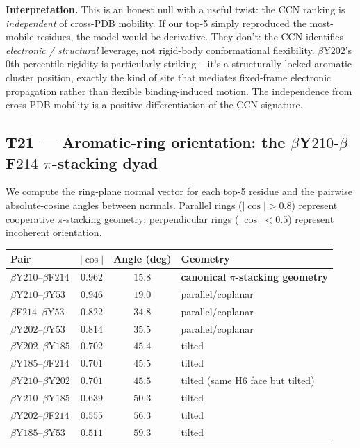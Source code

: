 \documentclass[11pt,a4paper]{article}
\begin{document}
\textbf{Interpretation.} This is an honest null with a useful twist:
the CCN ranking is \emph{independent} of cross-PDB mobility. If our
top-5 simply reproduced the most-mobile residues, the model would be
derivative. They don't: the CCN identifies \emph{electronic / structural}
leverage, not rigid-body conformational flexibility. $\beta$Y$202$'s
0th-percentile rigidity is particularly striking -- it's a structurally
locked aromatic-cluster position, exactly the kind of site that
mediates fixed-frame electronic propagation rather than flexible
binding-induced motion. The independence from cross-PDB mobility is
a positive differentiation of the CCN signature.

\subsection{\textsf{T21} --- Aromatic-ring orientation: the $\beta$Y$210$-$\beta$F$214$ $\pi$-stacking dyad}\label{ssec:t21}

We compute the ring-plane normal vector for each top-5 residue and
the pairwise absolute-cosine angles between normals. Parallel
rings ($|\cos| > 0.8$) represent cooperative $\pi$-stacking geometry;
perpendicular rings ($|\cos| < 0.5$) represent incoherent orientation.

\begin{center}\small
\begin{tabular}{lccl}\toprule
Pair & $|\cos|$ & Angle (deg) & Geometry \\\midrule
$\beta$Y$210$--$\beta$F$214$ & $\mathbf{0.962}$ & $\mathbf{15.8}$ & \textbf{canonical $\pi$-stacking geometry} \\
$\beta$Y$210$--$\beta$Y$53$  & $0.946$ & $19.0$ & parallel/coplanar \\
$\beta$F$214$--$\beta$Y$53$  & $0.822$ & $34.8$ & parallel/coplanar \\
$\beta$Y$202$--$\beta$Y$53$  & $0.814$ & $35.5$ & parallel/coplanar \\
$\beta$Y$202$--$\beta$Y$185$ & $0.702$ & $45.4$ & tilted \\
$\beta$Y$185$--$\beta$F$214$ & $0.701$ & $45.5$ & tilted \\
$\beta$Y$210$--$\beta$Y$202$ & $0.701$ & $45.5$ & tilted (same H6 face but tilted) \\
$\beta$Y$210$--$\beta$Y$185$ & $0.639$ & $50.3$ & tilted \\
$\beta$Y$202$--$\beta$F$214$ & $0.555$ & $56.3$ & tilted \\
$\beta$Y$185$--$\beta$Y$53$  & $0.511$ & $59.3$ & tilted \\
\bottomrule\end{tabular}
\end{center}
\end{document}
